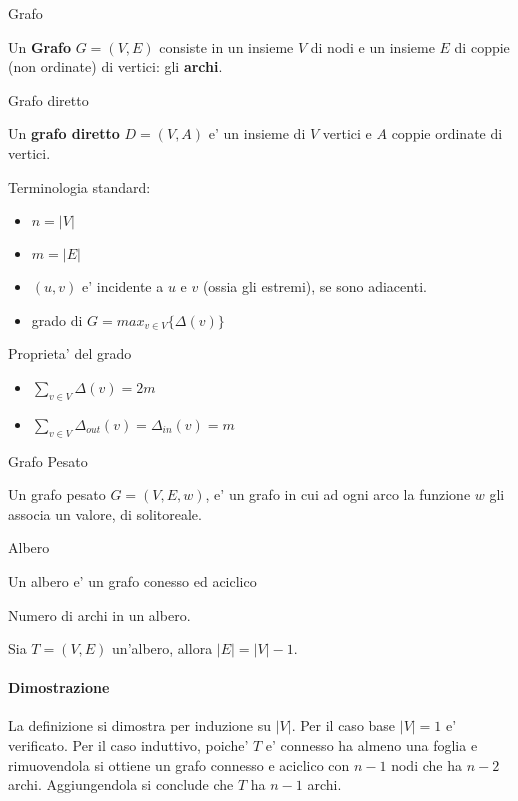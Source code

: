 \begin{definition}{Grafo}

    Un \textbf{Grafo} $G=(V,E)$ consiste in un insieme $V$ di nodi
    e un insieme $E$ di coppie (non ordinate) di vertici: gli \textbf{archi}.
\end{definition}

\begin{definition}{Grafo diretto}

    Un \textbf{grafo diretto} $D=(V,A)$ e' un insieme di $V$ vertici e $A$ coppie 
    ordinate di vertici.
\end{definition} 

Terminologia standard: 
\begin{itemize}
    \item $n=|V|$
    \item $m=|E|$
    \item $(u,v)$ e' incidente a $u$ e $v$ (ossia gli estremi), se sono adiacenti.
    \item grado di $G = max_{v \in V}\{\Delta(v)\}$
\end{itemize}

\begin{definition}{Proprieta' del grado}
    \begin{itemize}
        \item $\sum_{v \in V} \Delta(v) = 2m$
        \item $\sum_{v \in V} \Delta_{out}(v) = \Delta_{in}(v) = m$
    \end{itemize}
\end{definition}

\begin{definition}{Grafo Pesato}
    
    Un grafo pesato $G=(V,E,w)$, e' un grafo in cui ad ogni arco
    la funzione $w$ gli associa un valore, di solitoreale.
\end{definition}


\begin{definition} {Albero}

    Un albero e' un grafo conesso ed aciclico
\end{definition}

\begin{definition}{Numero di archi in un albero.}

    Sia $T=(V,E)$ un'albero, allora $|E|=|V|-1$.
\end{definition}

\paragraph{Dimostrazione}
La definizione si dimostra per induzione su $|V|$. Per il caso base $|V|=1$ e' verificato.
Per il caso induttivo, poiche' $T$ e' connesso ha almeno una foglia e rimuovendola si ottiene un grafo
connesso e aciclico con $n-1$ nodi che ha $n-2$ archi. Aggiungendola si conclude che $T$ ha $n-1$ archi.

